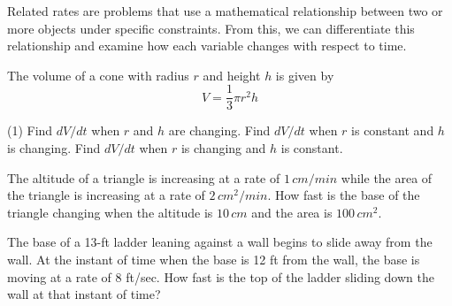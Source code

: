 \documentclass[../mathNotesPreamble]{subfiles}
\begin{document}
  \begin{thmBox*}
    Related rates are problems that use a mathematical relationship between two or more objects under specific constraints. From this, we can differentiate this relationship and examine how each variable changes with respect to time.
  \end{thmBox*}
  
  The volume of a cone with radius $r$ and height $h$ is given by 
    \[V=\frac{1}{3}\pi r^2h\]
  \begin{extasks}[after-item-skip=\stretch{1}](1)
    \task Find $dV/dt$ when $r$ and $h$ are changing.
    \task Find $dV/dt$ when $r$ is constant and $h$ is changing.
    \task Find $dV/dt$ when $r$ is changing and $h$ is constant.
  \end{extasks}
  \pagebreak
  
  \begin{ex*}
    The altitude of a triangle is increasing at a rate of $1\,cm/min$ while the area of the triangle is increasing at a rate of $2\,cm^2/min$. How fast is the base of the triangle changing when the altitude is $10\,cm$ and the area is $100\,cm^2$.
  \end{ex*}
  \begin{flushright}
  \end{flushright}
  \pagebreak
  
  \begin{ex*}
    The base of a 13-ft ladder leaning against a wall begins to slide away from the wall. At the instant of time when the base is 12 ft from the wall, the base is moving at a rate of 8 ft/sec. How fast is the top of the ladder sliding down the wall at that instant of time?
  \end{ex*}
  \pagebreak
  
\end{document}

